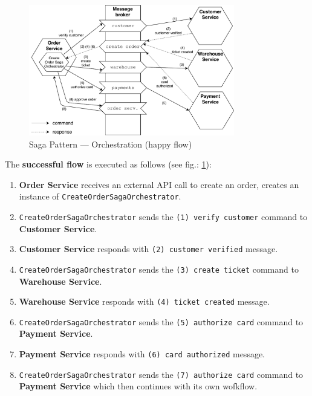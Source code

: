 \documentclass[thesis=M,english,hidelinks]{FITthesis}[2012/10/20]
\begin{document}
\begin{figure}[!ht]
  \centering
    \includegraphics[width=0.8\textwidth]{images/saga-orch-happy.pdf}
    \caption{Saga Pattern --- Orchestration (happy flow)}
    \label{fig:saga-orch-happy}
\end{figure}

The \textbf{successful flow} is executed as follows (see fig.: \ref{fig:saga-orch-happy}):
\begin{enumerate}
    \item \textbf{Order Service} receives an external \acrshort{API} call to create an order, creates an instance of \texttt{CreateOrderSagaOrchestrator}.
    \item \texttt{CreateOrderSagaOrchestrator} sends the \texttt{(1) verify customer} command to \textbf{Customer Service}.
    \item \textbf{Customer Service} responds with \texttt{(2) customer verified} message.
    \item \texttt{CreateOrderSagaOrchestrator} sends the \texttt{(3) create ticket} command to \textbf{Warehouse Service}.
    \item \textbf{Warehouse Service} responds with \texttt{(4) ticket created} message.
    \item \texttt{CreateOrderSagaOrchestrator} sends the \texttt{(5) authorize card} command to \textbf{Payment Service}.
    \item \textbf{Payment Service} responds with \texttt{(6) card authorized} message.
    \item \texttt{CreateOrderSagaOrchestrator} sends the \texttt{(7) authorize card} command to \textbf{Payment Service} which then continues with its own wofkflow.
\end{enumerate}
\end{document}
